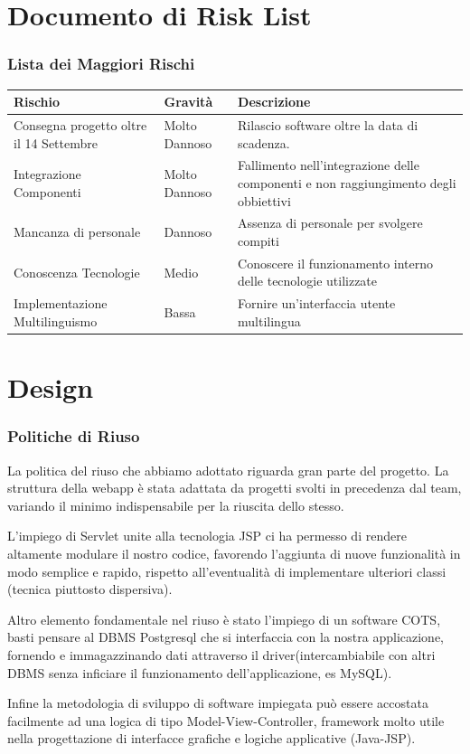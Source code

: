 \documentclass[a4paper,12pt]{beamer}
\begin{document}
\section{Documento di Risk List}
\begin{frame}
\frametitle{Lista dei Maggiori Rischi}
\footnotesize{
\begin{table}[h]
\begin{center}
\begin{tabular}{ p{4cm} p{2cm} p{3cm} } 
\rowcolor{Ash}	
\hline	
Rischio & Gravità & Descrizione  \\ \hline
Consegna progetto oltre il 14 Settembre & Molto Dannoso & Rilascio software oltre la data di scadenza. \\ 
Integrazione Componenti & Molto Dannoso & Fallimento nell'integrazione delle componenti e non raggiungimento degli obbiettivi  \\ 
Mancanza di personale & Dannoso & Assenza di personale per svolgere compiti \\ 
Conoscenza Tecnologie & Medio & Conoscere il funzionamento interno delle tecnologie utilizzate \\ 
Implementazione Multilinguismo & Bassa & Fornire un'interfaccia utente multilingua  \\ \hline
\end{tabular}
\end{center}
\end{table}}
\end{frame}

\pagebreak

\section{Design}
\begin{frame}
\frametitle{Politiche di Riuso}
\small{
La politica del riuso che abbiamo adottato riguarda gran parte del progetto. La struttura della webapp è stata adattata da progetti svolti in precedenza dal team, variando il minimo indispensabile per la riuscita dello stesso.

L'impiego di Servlet unite alla tecnologia JSP ci ha permesso di rendere altamente modulare il nostro codice, favorendo l'aggiunta di nuove funzionalità in modo semplice e rapido, rispetto all'eventualità di implementare ulteriori classi (tecnica piuttosto dispersiva).

Altro elemento fondamentale nel riuso è stato l'impiego di un software COTS, basti pensare al DBMS Postgresql che si interfaccia con la nostra applicazione, fornendo e immagazzinando dati attraverso il driver(intercambiabile con altri DBMS senza inficiare il funzionamento dell'applicazione, es MySQL).

Infine la metodologia di sviluppo di software impiegata può essere accostata facilmente ad una logica di tipo Model-View-Controller, framework molto utile nella progettazione di interfacce grafiche e logiche applicative (Java-JSP).}
\end{frame}
\end{document}
